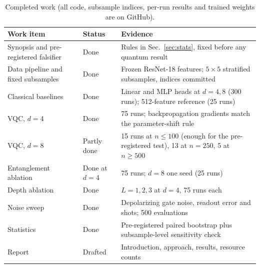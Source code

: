 \documentclass[conference]{IEEEtran}
\begin{document}
\begin{table}[t]
\centering
\caption{Completed work (all code, subsample indices, per-run results and
trained weights are on GitHub).}
\label{tab:done}
\footnotesize
\begin{tabular}{@{}p{}p{}p{}@{}}
\toprule
Work item & Status & Evidence \\
\midrule
Synopsis and pre-registered falsifier & Done & Rules in Sec.~\ref{sec:stats}, fixed before any quantum result \\
Data pipeline and fixed subsamples & Done & Frozen ResNet-18 features; $5\times5$ stratified subsamples, indices committed \\
Classical baselines & Done & Linear and MLP heads at $d=4,8$ (300 runs); 512-feature reference (25 runs) \\
VQC, $d=4$ & Done & 75 runs; backpropagation gradients match the parameter-shift rule \\
VQC, $d=8$ & Partly done & 15 runs at $n\le100$ (enough for the pre-registered test), 13 at $n=250$, 5 at $n\ge500$ \\
Entanglement ablation & Done at $d=4$ & 75 runs; $d=8$ one seed (25 runs) \\
Depth ablation & Done & $L=1,2,3$ at $d=4$, 75 runs each \\
Noise sweep & Done & Depolarizing gate noise, readout error and shots; 500 evaluations \\
Statistics & Done & Pre-registered paired bootstrap plus subsample-level sensitivity check \\
Report & Drafted & Introduction, approach, results, resource counts \\
\bottomrule
\end{tabular}
\end{table}
\end{document}
